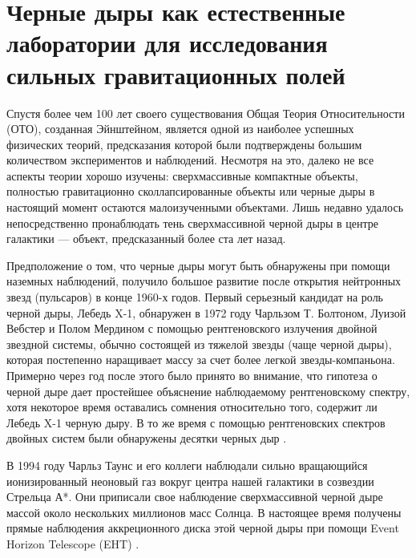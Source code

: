 \chapter{Черные дыры как естественные лаборатории для исследования сильных гравитационных полей}\label{ch:1}
Спустя более чем 100 лет своего существования Общая Теория Относительности (ОТО), созданная Эйнштейном, является одной из наиболее успешных физических теорий, предсказания которой были подтверждены большим количеством экспериментов и наблюдений. Несмотря на это,  далеко не все аспекты теории хорошо изучены: сверхмассивные компактные объекты, полностью гравитационно сколлапсированные объекты или черные дыры в настоящий момент остаются малоизученными объектами. Лишь недавно удалось непосредственно пронаблюдать тень сверхмассивной черной дыры в центре галактики — объект, предсказанный более ста лет назад.

Предположение о том, что черные дыры могут быть обнаружены при помощи наземных наблюдений, получило большое развитие после открытия нейтронных звезд (пульсаров) в конце 1960-х годов. Первый серьезный кандидат на роль черной дыры, Лебедь X-1, обнаружен в 1972 году Чарльзом Т. Болтоном, Луизой Вебстер и Полом Мердином \cite{boltonDimensionsBinarySystem1972, websterCygnusX1aSpectroscopic1972} с помощью рентгеновского излучения двойной звездной системы, обычно состоящей из тяжелой звезды (чаще черной дыры), которая постепенно наращивает массу за счет более легкой звезды-компаньона. Примерно через год после этого было принято во внимание, что гипотеза о черной дыре дает простейшее объяснение наблюдаемому рентгеновскому спектру, хотя некоторое время оставались сомнения относительно того, содержит ли Лебедь X-1 черную дыру. В то же время с помощью рентгеновских спектров двойных систем были обнаружены десятки черных дыр \cite{tetarenkoWATCHDOGCOMPREHENSIVEALLSKY2016}.

В 1994 году Чарльз Таунс и его коллеги \cite{genzelNucleusOurGalaxy1994, danchiCharacteristicsDustShells1994} наблюдали сильно вращающийся ионизированный неоновый газ вокруг центра нашей галактики в созвездии Стрельца А*. Они приписали свое наблюдение сверхмассивной черной дыре массой около нескольких миллионов масс Солнца. В настоящее время получены прямые наблюдения аккреционного диска этой черной дыры при помощи Event Horizon Telescope (EHT) \cite{EHTSgrA2022, EHTM872019}. 


